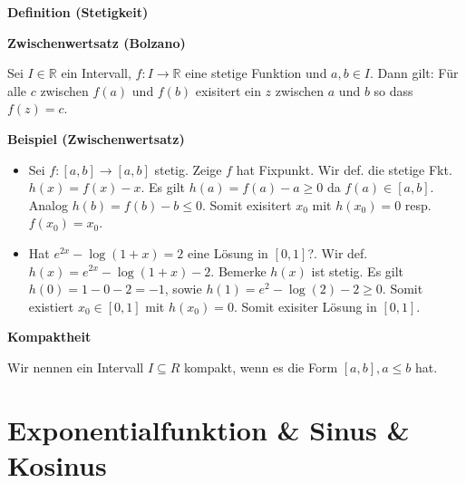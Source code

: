 \documentclass[25pt]{sciposter}
\newcommand{\R}{\mathbb{R}}
\newenvironment{method}[1]{\begin{mdframed}[backgroundcolor=blue!10,innertopmargin=15pt, innerbottommargin=15pt, nobreak=true]
		\textbf{#1 }
	}
	{ 
	\end{mdframed}
}
\begin{document}
\begin{multicols}{3}
\begin{method}{Definition (Stetigkeit)}
\end{method}



\begin{method}{ {\Large Zwischenwertsatz (Bolzano)} }
	Sei $I \in \R$ ein Intervall, $f: I \to \R$ eine stetige Funktion und $a,b \in I$. Dann gilt: Für alle $c$ zwischen $f(a)$ und $f(b)$ exisitert ein $z$ zwischen $a$ und $b$ so dass $f(z) = c$.
\end{method}

\textbf{Beispiel (Zwischenwertsatz)}
\begin{itemize}
	\item Sei $f:[a,b]\to [a,b]$ stetig. Zeige $f$ hat Fixpunkt. Wir def. die stetige Fkt. $h(x) = f(x)-x$. Es gilt $h(a) = f(a)-a \geq 0$ da $f(a) \in [a,b]$. Analog $h(b) = f(b)-b\leq 0$. Somit exisitert $x_0$ mit $h(x_0) = 0$ resp. $f(x_0) = x_0$.
	\item Hat $e^{2x} - \log (1+x) = 2$ eine Lösung in $[0,1]$?. Wir def. $h(x) = e^{2x} - \log (1+x) -2$. Bemerke $h(x)$ ist stetig. Es gilt $h(0) = 1 - 0 - 2 = -1$, sowie $h(1) = e^2 - \log(2) -2 \geq 0$. Somit existiert $x_0 \in [0,1]$ mit $h(x_0) = 0$. Somit exisiter Lösung in $[0,1]$.
\end{itemize}


\begin{method}{Kompaktheit}
	Wir nennen ein Intervall $I \subseteq R$ kompakt, wenn es die Form $[a,b], a \leq b$ hat.
\end{method}



\section*{Exponentialfunktion \& Sinus \& Kosinus}


\end{multicols}
\end{document}
